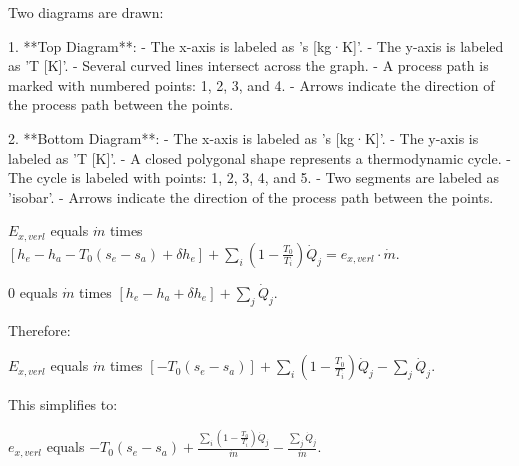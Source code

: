 Two diagrams are drawn:

1. **Top Diagram**:  
   - The x-axis is labeled as 's [kg·K]'.  
   - The y-axis is labeled as 'T [K]'.  
   - Several curved lines intersect across the graph.  
   - A process path is marked with numbered points: 1, 2, 3, and 4.  
   - Arrows indicate the direction of the process path between the points.  

2. **Bottom Diagram**:  
   - The x-axis is labeled as 's [kg·K]'.  
   - The y-axis is labeled as 'T [K]'.  
   - A closed polygonal shape represents a thermodynamic cycle.  
   - The cycle is labeled with points: 1, 2, 3, 4, and 5.  
   - Two segments are labeled as 'isobar'.  
   - Arrows indicate the direction of the process path between the points.

\( E_{x, verl} \) equals \( \dot{m} \) times \([h_e - h_a - T_0 (s_e - s_a) + \delta h_e] + \sum_i \left(1 - \frac{T_0}{T_i}\right) \dot{Q}_j = e_{x, verl} \cdot \dot{m} \).  

0 equals \( \dot{m} \) times \([h_e - h_a + \delta h_e] + \sum_j \dot{Q}_j \).  

Therefore:  

\( E_{x, verl} \) equals \( \dot{m} \) times \([-T_0 (s_e - s_a)] + \sum_i \left(1 - \frac{T_0}{T_i}\right) \dot{Q}_j - \sum_j \dot{Q}_j \).  

This simplifies to:  

\( e_{x, verl} \) equals \(-T_0 (s_e - s_a) + \frac{\sum_i \left(1 - \frac{T_0}{T_i}\right) \dot{Q}_j}{\dot{m}} - \frac{\sum_j \dot{Q}_j}{\dot{m}} \).
